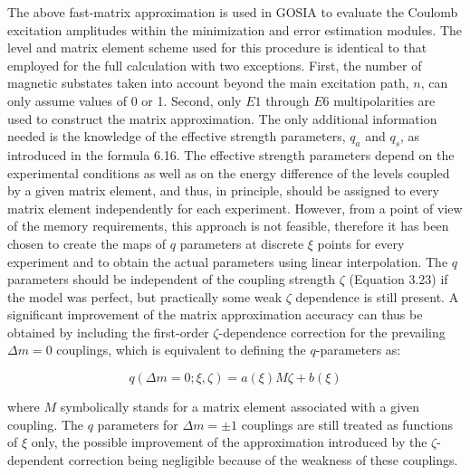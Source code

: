 \documentclass[10pt]{article}
\begin{document}
The above fast-matrix approximation is used in GOSIA to evaluate the Coulomb excitation amplitudes within the minimization and error estimation modules. The level and matrix element scheme used for this procedure is identical to that employed for the full calculation with two exceptions. First, the number of magnetic substates taken into account beyond the main excitation path, $n$, can only assume values of 0 or 1. Second, only $E 1$ through $E 6$ multipolarities are used to construct the matrix approximation. The only additional information needed is the knowledge of the effective strength parameters, $q_{a}$ and $q_{s}$, as introduced in the formula 6.16. The effective strength parameters depend on the experimental conditions as well as on the energy difference of the levels coupled by a given matrix element, and thus, in principle, should be assigned to every matrix element independently for each experiment. However, from a point of view of the memory requirements, this approach is not feasible, therefore it has been chosen to create the maps of $q$ parameters at discrete $\xi$ points for every experiment and to obtain the actual parameters using linear interpolation. The $q$ parameters should be independent of the coupling strength $\zeta$ (Equation 3.23) if the model was perfect, but practically some weak $\zeta$ dependence is still present. A significant improvement of the matrix approximation accuracy can thus be obtained by including the first-order $\zeta$-dependence correction for the prevailing $\Delta m=0$ couplings, which is equivalent to defining the $q$-parameters as:


\begin{equation*}
q(\Delta m=0 ; \xi, \zeta)=a(\xi) M \zeta+b(\xi) \tag{6.26}
\end{equation*}


where $M$ symbolically stands for a matrix element associated with a given coupling. The $q$ parameters for $\Delta m= \pm 1$ couplings are still treated as functions of $\xi$ only, the possible improvement of the approximation introduced by the $\zeta$-dependent correction being negligible because of the weakness of these couplings.
\end{document}

